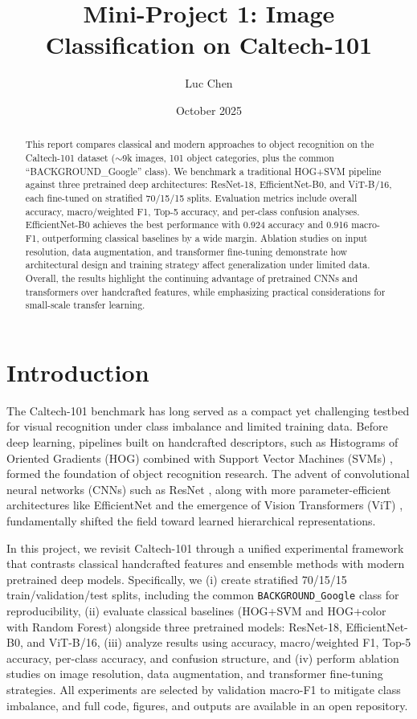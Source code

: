 \documentclass[11pt]{article}
\title{Mini-Project 1: Image Classification on Caltech-101}
\author{Luc Chen}
\date{October 2025}
\begin{document}
\maketitle



\begin{abstract}
\noindent
This report compares classical and modern approaches to object recognition on the Caltech-101 dataset ($\sim$9k images, 101 object categories, plus the common ``BACKGROUND\_Google'' class). We benchmark a traditional HOG+SVM pipeline against three pretrained deep architectures: ResNet-18, EfficientNet-B0, and ViT-B/16, each fine-tuned on stratified 70/15/15 splits. Evaluation metrics include overall accuracy, macro/weighted F1, Top-5 accuracy, and per-class confusion analyses. EfficientNet-B0 achieves the best performance with 0.924 accuracy and 0.916 macro-F1, outperforming classical baselines by a wide margin. Ablation studies on input resolution, data augmentation, and transformer fine-tuning demonstrate how architectural design and training strategy affect generalization under limited data. Overall, the results highlight the continuing advantage of pretrained CNNs and transformers over handcrafted features, while emphasizing practical considerations for small-scale transfer learning.
\end{abstract}

\vspace{1em}


\section{Introduction}
The Caltech-101 benchmark \cite{FeiFei2004} has long served as a compact yet challenging testbed for visual recognition under class imbalance and limited training data. Before deep learning, pipelines built on handcrafted descriptors, such as Histograms of Oriented Gradients (HOG) \cite{Dalal2005} combined with Support Vector Machines (SVMs) \cite{Cortes1995}, formed the foundation of object recognition research. The advent of convolutional neural networks (CNNs) such as ResNet \cite{He2016}, along with more parameter-efficient architectures like EfficientNet \cite{Tan2019} and the emergence of Vision Transformers (ViT) \cite{Dosovitskiy2021}, fundamentally shifted the field toward learned hierarchical representations.

In this project, we revisit Caltech-101 through a unified experimental framework that contrasts classical handcrafted features and ensemble methods with modern pretrained deep models. Specifically, we (i) create stratified 70/15/15 train/validation/test splits, including the common \texttt{BACKGROUND\_Google} class for reproducibility, (ii) evaluate classical baselines (HOG+SVM and HOG+color with Random Forest) alongside three pretrained models: ResNet-18, EfficientNet-B0, and ViT-B/16, (iii) analyze results using accuracy, macro/weighted F1, Top-5 accuracy, per-class accuracy, and confusion structure, and (iv) perform ablation studies on image resolution, data augmentation, and transformer fine-tuning strategies. All experiments are selected by validation macro-F1 to mitigate class imbalance, and full code, figures, and outputs are available in an open repository.
\end{document}
